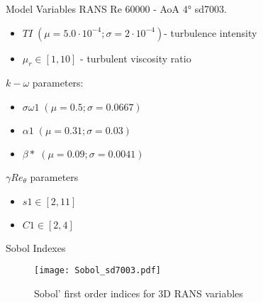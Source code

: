 \begin{frame}{Model Variables}
RANS Re $\num{60000}$ - AoA $\ang{4}$ sd7003.

\begin{itemize}
    \item    $TI \; (\mu =5.0\cdot 10^{-4} ; \sigma=2\cdot 10^{-4})$- turbulence intensity
    \item $\mu_r \in [1,10]$ - turbulent viscosity ratio
\end{itemize}

$k-\omega$ parameters:
\begin{itemize}
    \item $\sigma \omega 1\; (\mu =0.5 ; \sigma=0.0667 )$
    \item $\alpha 1\; (\mu = 0.31 ;\sigma= 0.03)$ 
    \item $\beta *\; (\mu = 0.09; \sigma=0.0041 )$  
\end{itemize}
$\gamma Re_\theta$ parameters
\begin{itemize}
\item $s1\in [2,11]$
\item $C1\in [2,4]$
\end{itemize}
\end{frame}


\begin{frame}{Sobol Indexes}
    
    \begin{figure}
        \centering
        \texttt{[image: Sobol\_sd7003.pdf]}
        \caption{Sobol' first order indices for 3D RANS variables}
\end{figure} 
\end{frame}